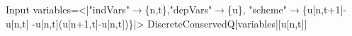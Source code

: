 \begin{mmaCell}[moredefined={variables, expression, DiscreteConservedQ}]{Input}
  variables=<|"indVars"\(\pmb{\to}\)\{n,t\},"depVars"\(\pmb{\to}\)\{u\},
  "scheme"\(\pmb{\to}\)\{u[n,t+1]-u[n,t]
  -u[n,t](u[n+1,t]-u[n,t])\}|>
  DiscreteConservedQ[variables][u[n,t]]
  
\end{mmaCell}